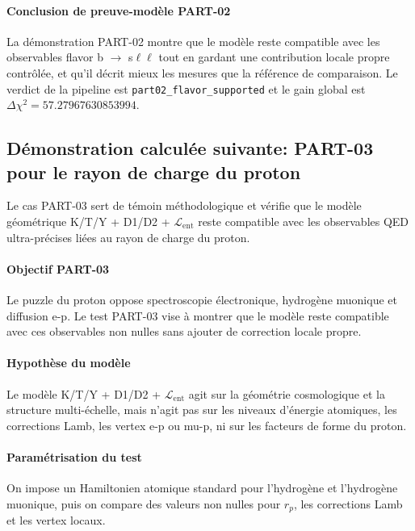 \documentclass[11pt,a4paper]{article}
\newcommand{\Lent}{\mathcal{L}_{\mathrm{ent}}}
\begin{document}
\FloatBarrier

\paragraph{Conclusion de preuve-modèle PART-02}
La démonstration PART-02 montre que le modèle reste compatible avec les observables flavor b $\to$ s$\ell\ell$ tout en gardant une contribution locale propre contrôlée, et qu'il décrit mieux les mesures que la référence de comparaison. Le verdict de la pipeline est \texttt{part02\_flavor\_supported} et le gain global est $\Delta\chi^2=57.27967630853994$.

\subsection{Démonstration calculée suivante: PART-03 pour le rayon de charge du proton}
Le cas PART-03 sert de témoin méthodologique et vérifie que le modèle géométrique K/T/Y + D1/D2 + $\Lent$ reste compatible avec les observables QED ultra-précises liées au rayon de charge du proton.

\paragraph{Objectif PART-03}
Le puzzle du proton oppose spectroscopie électronique, hydrogène muonique et diffusion e-p. Le test PART-03 vise à montrer que le modèle reste compatible avec ces observables non nulles sans ajouter de correction locale propre.

\paragraph{Hypothèse du modèle}
Le modèle K/T/Y + D1/D2 + $\Lent$ agit sur la géométrie cosmologique et la structure multi-échelle, mais n'agit pas sur les niveaux d'énergie atomiques, les corrections Lamb, les vertex e-p ou mu-p, ni sur les facteurs de forme du proton.

\paragraph{Paramétrisation du test}
On impose un Hamiltonien atomique standard pour l'hydrogène et l'hydrogène muonique, puis on compare des valeurs non nulles pour $r_p$, les corrections Lamb et les vertex locaux.
\end{document}
